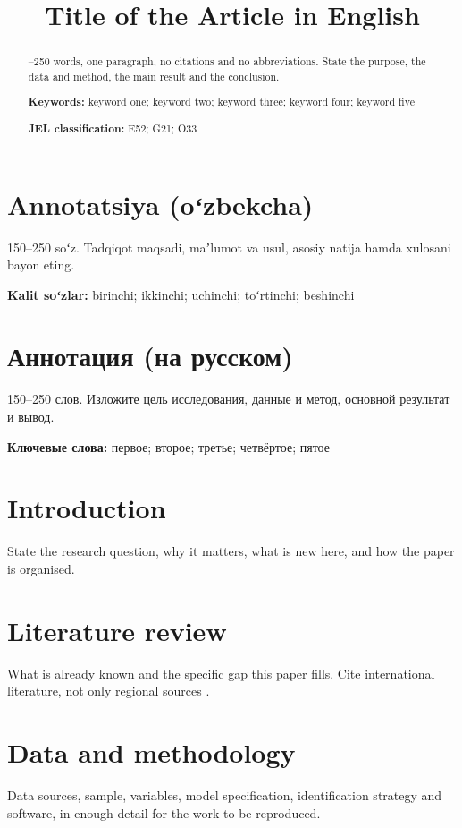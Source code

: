 \documentclass[12pt,a4paper]{article}
\title{\textbf{Title of the Article in English}}
\date{}                      %
\author{}                    %
\begin{document}
\maketitle

\begin{abstract}
--250 words, one paragraph, no citations and no abbreviations.
State the purpose, the data and method, the main result and the conclusion.

\medskip
\noindent\textbf{Keywords:} keyword one; keyword two; keyword three;
keyword four; keyword five

\noindent\textbf{JEL classification:} E52; G21; O33
\end{abstract}

\section*{Annotatsiya (oʻzbekcha)}
150--250 soʻz. Tadqiqot maqsadi, maʼlumot va usul, asosiy natija hamda
xulosani bayon eting.

\noindent\textbf{Kalit soʻzlar:} birinchi; ikkinchi; uchinchi; toʻrtinchi;
beshinchi

\section*{Аннотация (на русском)}
150--250 слов. Изложите цель исследования, данные и метод, основной
результат и вывод.

\noindent\textbf{Ключевые слова:} первое; второе; третье; четвёртое; пятое

\newpage

\section{Introduction}
State the research question, why it matters, what is new here, and how the
paper is organised.

\section{Literature review}
What is already known and the specific gap this paper fills. Cite
international literature, not only regional sources \citep{acemoglu2012}.

\section{Data and methodology}
Data sources, sample, variables, model specification, identification
strategy and software, in enough detail for the work to be reproduced.
\end{document}
